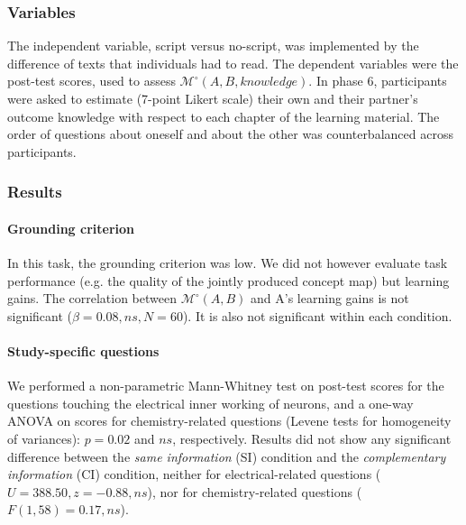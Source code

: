 \documentclass[natbib]{svjour3}
\newcommand{\eg}{e.g.\xspace}
\newcommand{\A}{A\xspace}
\newcommand{\M}[3]{{\mathcal{M}(#1, #2, #3)}}
\newcommand{\Model}[3]{{$\mathcal{M}^{\circ}(#1, #2, #3)$}}
\newcommand{\gModel}[2]{{$\mathcal{M}^{\circ}(#1, #2)$}}
\newcommand{\Mdeg}[3]{{\mathcal{M}^{\circ}(#1, #2, #3)}}
\begin{document}
\subsubsection*{Variables}

The independent variable, script versus no-script, was implemented by the
difference of texts that individuals had to read.  The dependent variables were
the post-test scores, used to assess \Model{A}{B}{knowledge}. In phase 6,
participants were asked to estimate (7-point Likert scale) their own and their
partner's outcome knowledge with respect to each chapter of the learning
material. The order of questions about oneself and about the other was
counterbalanced across participants. 
%
%
%

\subsubsection*{Results}

\paragraph{Grounding criterion} In this task, the grounding criterion was low.
We did not however evaluate task performance (\eg the quality of the jointly
produced concept map) but learning gains. The correlation between \gModel{A}{B}
and \A's learning gains is not significant ($\beta = 0.08, ns, N = 60$). It is
also not significant within each condition.

\paragraph{Study-specific questions} We performed a non-parametric Mann-Whitney
test on post-test scores for the questions touching the electrical inner working
of neurons, and a one-way ANOVA on scores for chemistry-related questions
(Levene tests for homogeneity of variances): $p = 0.02$ and $ns$, respectively.
Results did not show any significant difference between the \emph{same
information} (SI) condition and the \emph{complementary information} (CI)
condition, neither for electrical-related questions ($U = 388.50, z = -0.88,
ns$), nor for chemistry-related questions ($F(1, 58) = 0.17, ns$).
\end{document}
